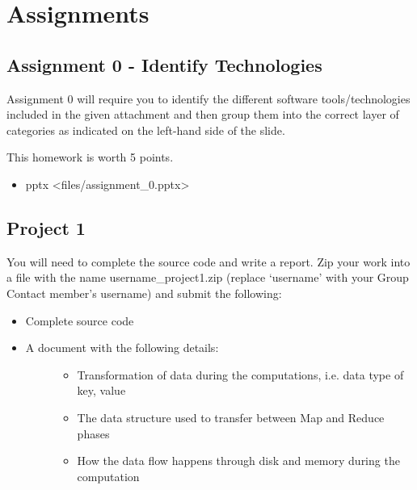 \FILENAME

\section{Assignments}\label{assignments}

\subsection{Assignment 0 - Identify Technologies}\label{assignment-0}

Assignment 0 will require you to identify the different software
tools/technologies included in the given attachment and then group
them into the correct layer of categories as indicated on the
left-hand side of the slide.

This homework is worth 5 points.

\begin{itemize}

\item
  pptx \textless{}files/assignment\_0.pptx\textgreater{}
\end{itemize}

\subsection{Project 1}\label{project-1}

You will need to complete the source code and write a report. Zip your
work into a file with the name username\_project1.zip (replace
`username' with your Group Contact member's username) and submit the
following:

\begin{itemize}
\item
  Complete source code
\item
  \begin{description}
  \item[A document with the following details:]
  \begin{itemize}

  \item
    Transformation of data during the computations, i.e. data type of
    key, value
  \item
    The data structure used to transfer between Map and Reduce phases
  \item
    How the data flow happens through disk and memory during the
    computation
  \end{itemize}
  \end{description}
\end{itemize}

